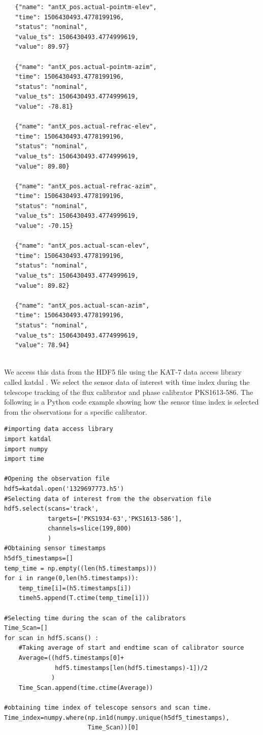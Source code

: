\begin{tcolorbox}
\begin{lstlisting}
   {"name": "antX_pos.actual-pointm-elev",
   "time": 1506430493.4778199196,
   "status": "nominal",
   "value_ts": 1506430493.4774999619,
   "value": 89.97}
   
   {"name": "antX_pos.actual-pointm-azim",
   "time": 1506430493.4778199196,
   "status": "nominal",
   "value_ts": 1506430493.4774999619,
   "value": -78.81}
   
   {"name": "antX_pos.actual-refrac-elev",
   "time": 1506430493.4778199196,
   "status": "nominal",
   "value_ts": 1506430493.4774999619,
   "value": 89.80}
   
   {"name": "antX_pos.actual-refrac-azim",
   "time": 1506430493.4778199196,
   "status": "nominal",
   "value_ts": 1506430493.4774999619,
   "value": -70.15}
   
   {"name": "antX_pos.actual-scan-elev",
   "time": 1506430493.4778199196,
   "status": "nominal",
   "value_ts": 1506430493.4774999619,
   "value": 89.82}
   
   {"name": "antX_pos.actual-scan-azim",
   "time": 1506430493.4778199196,
   "status": "nominal",
   "value_ts": 1506430493.4774999619,
   "value": 78.94}
   
\end{lstlisting}
\end{tcolorbox}

We access this data from the HDF5 file using the KAT-7 data access library called katdal \citep{molenaar2017kern}. We select the sensor data of interest with time index during the telescope tracking of the flux calibrator and phase calibrator PKS1613-586. The following is a Python code example showing how the sensor time index is selected from the observations for a specific calibrator.

\begin{tcolorbox}
\begin{lstlisting}
#importing data access library
import katdal
import numpy
import time

#Opening the observation file 
hdf5=katdal.open('1329697773.h5')
#Selecting data of interest from the the observation file
hdf5.select(scans='track',
            targets=['PKS1934-63','PKS1613-586'],
            channels=slice(199,800)
            )   
#Obtaining sensor timestamps            
h5df5_timestamps=[]
temp_time = np.empty((len(h5.timestamps)))
for i in range(0,len(h5.timestamps)):
    temp_time[i]=(h5.timestamps[i])
    timeh5.append(T.ctime(temp_time[i]))      
       
#Selecting time during the scan of the calibrators
Time_Scan=[]
for scan in hdf5.scans() :
    #Taking average of start and endtime scan of calibrator source
    Average=((hdf5.timestamps[0]+
              hdf5.timestamps[len(hdf5.timestamps)-1])/2
             ) 
    Time_Scan.append(time.ctime(Average))
    
#obtaining time index of telescope sensors and scan time.
Time_index=numpy.where(np.in1d(numpy.unique(h5df5_timestamps),
                       Time_Scan))[0]
\end{lstlisting}
\end{tcolorbox}

